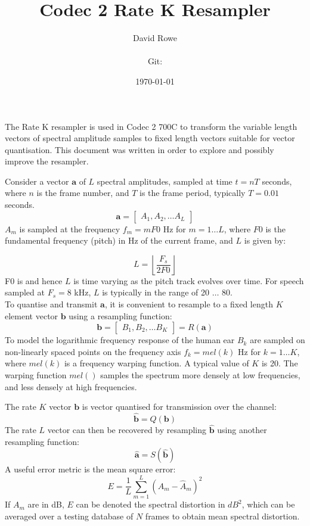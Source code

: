 \documentclass{article}
\title{Codec 2 Rate K Resampler}
\author{David Rowe\\ \\ Git: \gitrevision}
\date{\today}
\begin{document}
\maketitle

The Rate K resampler is used in Codec 2 700C to transform the variable length vectors of spectral amplitude samples to fixed length vectors suitable for vector quantisation.  This document was written in order to explore and possibly improve the resampler.

Consider a vector $\mathbf{a}$ of $L$ spectral amplitudes, sampled at time $t=nT$ seconds, where $n$ is the frame number, and $T$ is the frame period, typically $T=0.01$ seconds. 
\begin{equation}
\mathbf{a} = \begin{bmatrix} A_1, A_2, \ldots A_L \end{bmatrix} 
\end{equation}
$A_m$ is sampled at the frequency $f_m=mF0$ Hz for $m=1 \ldots L$, where $F0$ is the fundamental frequency (pitch) in Hz of the current frame, and $L$ is given by:

\begin{equation}
L=\left \lfloor \frac{F_s}{2F0} \right \rfloor
\end{equation}
F0 is and hence $L$ is time varying as the pitch track evolves over time. For speech sampled at $F_s=8$ kHz, $L$ is typically in the range of 20 $\ldots$ 80. \\

To quantise and transmit $\mathbf{a}$, it is convenient to resample to a fixed length $K$ element vector $\mathbf{b}$ using a resampling function:
\begin{equation}
\mathbf{b} = \begin{bmatrix} B_1, B_2, \ldots B_K \end{bmatrix} = R(\mathbf{a})
\end{equation}
To model the logarithmic frequency response of the human ear $B_k$  are sampled on non-linearly spaced points on the frequency axis $f_k=mel(k)$ Hz for $k=1 \ldots K$, where $mel(k)$ is a frequency warping function. A typical value of $K$ is 20. The warping function $mel()$ samples the spectrum more densely at low frequencies, and less densely at high frequencies.  

The rate $K$ vector $\mathbf{b}$ is vector quantised for transmission over the channel:
\begin{equation}
\hat{\mathbf{b}} = Q(\mathbf{b})
\end{equation}
The rate $L$ vector can then be recovered by resampling $\mathbf{\hat{b}}$ using another resampling function:
\begin{equation}
\hat{\mathbf{a}} = S(\hat{\mathbf{b}})
\end{equation}
A useful error metric is the mean square error:
\begin{equation}
E=\frac{1}{L}\sum_{m=1}^{L}(A_m-\hat{A}_m)^2
\end{equation}
If $A_m$ are in dB, $E$ can be denoted the spectral distortion in $dB^2$, which can be averaged over a testing database of $N$ frames to obtain mean spectral distortion.
\end{document}
